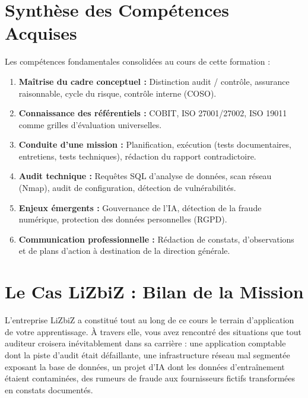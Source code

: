 \section*{Synthèse des Compétences Acquises}

\begin{boxresume}
Les compétences fondamentales consolidées au cours de cette formation :

\begin{enumerate}
    \item \textbf{Maîtrise du cadre conceptuel :} Distinction audit / contrôle, assurance raisonnable, cycle du risque, contrôle interne (COSO).
    \item \textbf{Connaissance des référentiels :} COBIT, ISO 27001/27002, ISO 19011 comme grilles d'évaluation universelles.
    \item \textbf{Conduite d'une mission :} Planification, exécution (tests documentaires, entretiens, tests techniques), rédaction du rapport contradictoire.
    \item \textbf{Audit technique :} Requêtes SQL d'analyse de données, scan réseau (Nmap), audit de configuration, détection de vulnérabilités.
    \item \textbf{Enjeux émergents :} Gouvernance de l'IA, détection de la fraude numérique, protection des données personnelles (RGPD).
    \item \textbf{Communication professionnelle :} Rédaction de constats, d'observations et de plans d'action à destination de la direction générale.
\end{enumerate}
\end{boxresume}

\section*{Le Cas LiZbiZ : Bilan de la Mission}

L'entreprise LiZbiZ a constitué tout au long de ce cours le terrain d'application de votre apprentissage. À travers elle, vous avez rencontré des situations que tout auditeur croisera inévitablement dans sa carrière : une application comptable dont la piste d'audit était défaillante, une infrastructure réseau mal segmentée exposant la base de données, un projet d'IA dont les données d'entraînement étaient contaminées, des rumeurs de fraude aux fournisseurs fictifs transformées en constats documentés.

